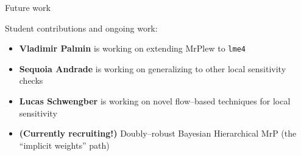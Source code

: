 

\begin{frame}{Future work}

Student contributions and ongoing work:

\begin{itemize}
\item \textbf{Vladimir Palmin} is working on extending MrPlew to \texttt{lme4}
\item \textbf{Sequoia Andrade} is working on generalizing to other local sensitivity checks
\item \textbf{Lucas Schwengber} is working on novel flow--based techniques for local sensitivity
\item \textbf{(Currently recruiting!)} Doubly--robust Bayesian Hierarchical MrP (the ``implicit weights'' path)
\end{itemize}



\end{frame}
